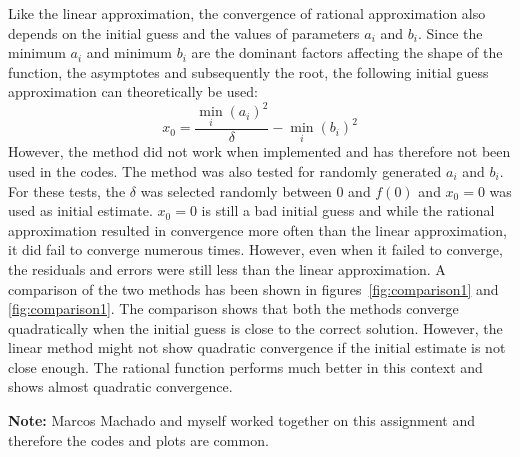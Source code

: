\documentclass[11pt, oneside]{article}
\begin{document}
	Like the linear approximation, the convergence of rational approximation also depends on the initial guess and the values of parameters $a_i$ and $b_i$. Since the minimum $a_i$ and minimum $b_i$ are the dominant factors affecting the shape of the function, the asymptotes and subsequently the root, the following initial guess approximation can theoretically be used:
	\begin{equation}
		x_0 = \frac{\min_i (a_i)^2}{\delta} - {\min_i (b_i)^2}
	\end{equation}
	However, the method did not work when implemented and has therefore not been used in the codes. The method was also tested for randomly generated $a_i$ and $b_i$. For these tests, the  $\delta$ was selected randomly between $0$ and $f(0)$ and $x_0=0$ was used as initial estimate. $x_0 = 0$ is still a bad initial guess and while the rational approximation resulted in convergence more often than the linear approximation, it did fail to converge numerous times. However, even when it failed to converge, the residuals and errors were still less than the linear approximation. A comparison of the two methods has been shown in figures~\ref{fig:comparison1} and \ref{fig:comparison1}. The comparison shows that both the methods converge quadratically when the initial guess is close to the correct solution. However, the linear method might not show quadratic convergence if the initial estimate is not close enough. The rational function performs much better in this context and shows almost quadratic convergence.
	
\textbf{Note:} Marcos Machado and myself worked together on this assignment and therefore the codes and plots are common.
	
\end{document}
